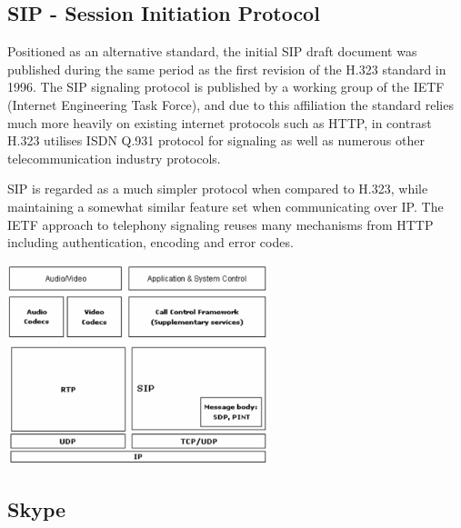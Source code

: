 \subsection{SIP - Session Initiation Protocol}
Positioned as an alternative standard, the initial SIP draft document was published during the same period as the first revision of the H.323 standard in 1996. The SIP signaling protocol is published by a working group of the IETF (Internet Engineering Task Force), and due to this affiliation the standard relies much more heavily on existing internet protocols such as HTTP, in contrast H.323 utilises ISDN Q.931 protocol for signaling as well as numerous other telecommunication industry protocols.

SIP is regarded as a much simpler protocol when compared to H.323\cite{paper:miroslavvozna}, while maintaining a somewhat similar feature set\cite{paper:SchulzrinnRosenber} when communicating over IP.  The IETF approach to telephony signaling reuses many mechanisms from HTTP including authentication, encoding and error codes.

\begin{center}
	\includegraphics[width=3in]{images/sip_protocol_suite.png}
\end{center}

\subsection{Skype}

